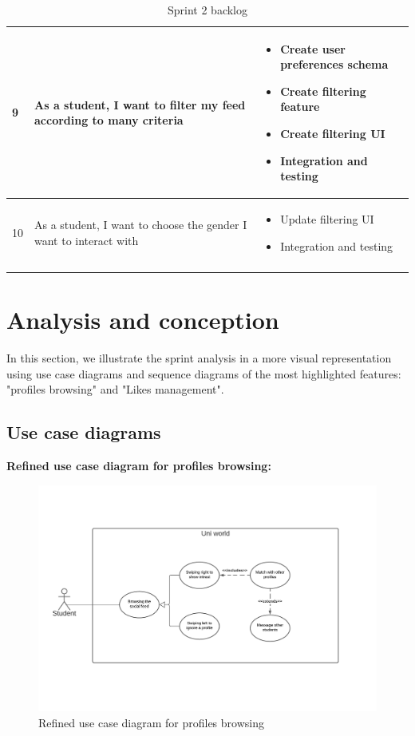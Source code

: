 \begin{longtable}{|l|p{6cm}|p{8cm}|}
9 & As a student, I want to filter my feed according to many criteria & \begin{itemize}
    \item Create user preferences schema
    \item Create filtering feature 
    \item Create filtering UI 
    \item Integration and testing
\end{itemize} \\ \hline

10 & As a student, I want to choose the gender I want to interact with & \begin{itemize}
    \item Update filtering UI 
    \item Integration and testing
\end{itemize} \\ \hline
\caption{Sprint 2 backlog}
\label{Tab: Sprint 2 backlog}
\end{longtable}


\section{ Analysis and conception}
In this section, we illustrate the sprint analysis in a more visual representation using use case diagrams and sequence diagrams of the most highlighted features:
"profiles browsing" and "Likes management".

\subsection{Use case diagrams}
\textbf{Refined use case diagram for profiles browsing: }
\begin{figure}[H] 
            \centering
            \includegraphics[scale=0.6]{diagrams/refined use case social swipe.png}
            \caption{Refined use case diagram for profiles browsing} 
            \label{fig: Refined use case diagram for profiles browsing}
\end{figure}

